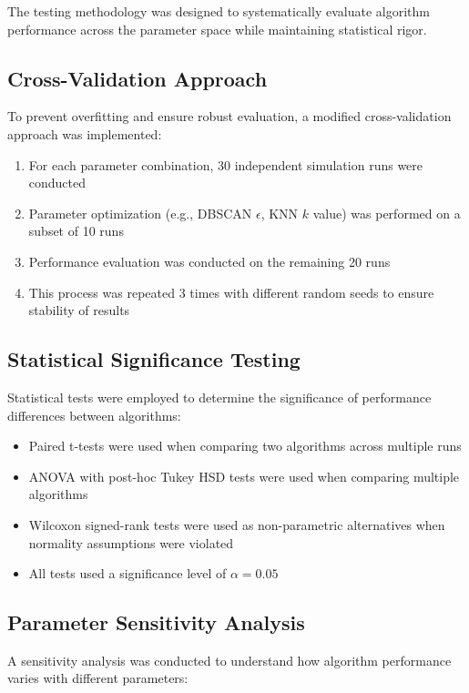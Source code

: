 The testing methodology was designed to systematically evaluate algorithm performance across the parameter space while maintaining statistical rigor.

\subsection{Cross-Validation Approach}

To prevent overfitting and ensure robust evaluation, a modified cross-validation approach was implemented:

\begin{enumerate}
    \item For each parameter combination, 30 independent simulation runs were conducted
    \item Parameter optimization (e.g., DBSCAN $\epsilon$, KNN $k$ value) was performed on a subset of 10 runs
    \item Performance evaluation was conducted on the remaining 20 runs
    \item This process was repeated 3 times with different random seeds to ensure stability of results
\end{enumerate}

\subsection{Statistical Significance Testing}

Statistical tests were employed to determine the significance of performance differences between algorithms:

\begin{itemize}
    \item Paired t-tests were used when comparing two algorithms across multiple runs
    \item ANOVA with post-hoc Tukey HSD tests were used when comparing multiple algorithms
    \item Wilcoxon signed-rank tests were used as non-parametric alternatives when normality assumptions were violated
    \item All tests used a significance level of $\alpha = 0.05$
\end{itemize}

\subsection{Parameter Sensitivity Analysis}

A sensitivity analysis was conducted to understand how algorithm performance varies with different parameters:

